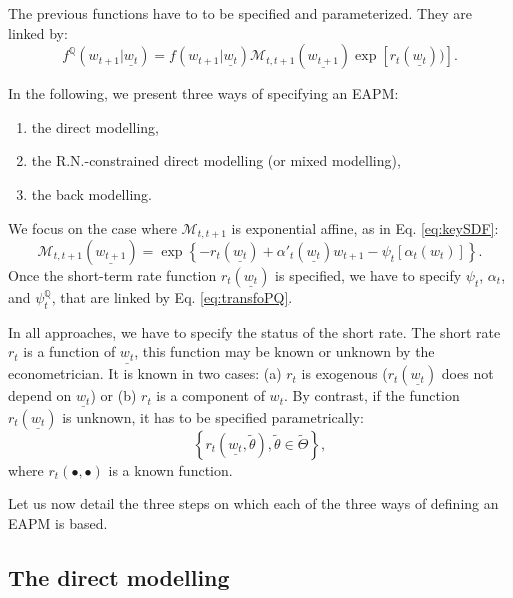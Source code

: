 \documentclass[
  12pt,
]{book}
\providecommand{\tightlist}{%
  \setlength{\itemsep}{0pt}\setlength{\parskip}{0pt}}
\theoremstyle{definition}
\theoremstyle{definition}
\theoremstyle{definition}
\theoremstyle{definition}
\theoremstyle{remark}
\begin{document}
The previous functions have to to be specified and parameterized. They are linked by:
\[
f^{\mathbb{Q}}(w_{t+1}|\underline{w_t}) = f(w_{t+1}|\underline{w_t}) \mathcal{M}_{t,t+1}(\underline{w_{t+1}}) \exp[r_{t}(\underline{w_t}))].
\]

In the following, we present three ways of specifying an EAPM:

\begin{enumerate}
\def\labelenumi{\arabic{enumi}.}
\tightlist
\item
  the direct modelling,
\item
  the R.N.-constrained direct modelling (or mixed modelling),
\item
  the back modelling.
\end{enumerate}

We focus on the case where \(\mathcal{M}_{t,t+1}\) is exponential affine, as in Eq. \eqref{eq:keySDF}:
\[
\mathcal{M}_{t,t+1} (\underline{w_{t+1}}) = \exp\left\{ -r_{t} (\underline{w_t}) + \alpha'_t(\underline{w_t})w_{t+1} - \psi_t [\alpha_t (w_t)]\right\}.
\]
Once the short-term rate function \(r_{t}(\underline{w_t})\) is specified, we have to specify \(\psi_t\), \(\alpha_t\), and \(\psi^{\mathbb{Q}}_t\), that are linked by Eq. \eqref{eq:transfoPQ}.

In all approaches, we have to specify the status of the short rate. The short rate \(r_{t}\) is a function of \(\underline{w_t}\), this function may be known or unknown by the econometrician. It is known in two cases: (a) \(r_{t}\) is exogenous (\(r_{t}(\underline{w_t})\) does not depend on \(\underline{w_t}\)) or (b) \(r_{t}\) is a component of \(w_t\). By contrast, if the function \(r_{t} (\underline{w_t})\) is unknown, it has to be specified parametrically:
\[
\left\{ r_{t} (\underline{w_t}, \tilde{\theta}), \tilde{\theta}\in \tilde{\Theta} \right\},
\]
where \(r_{t}(\bullet,\bullet)\) is a known function.

Let us now detail the three steps on which each of the three ways of defining an EAPM is based.

\hypertarget{DirectModeling}{%
\subsection{The direct modelling}\label{DirectModeling}}
\end{document}
